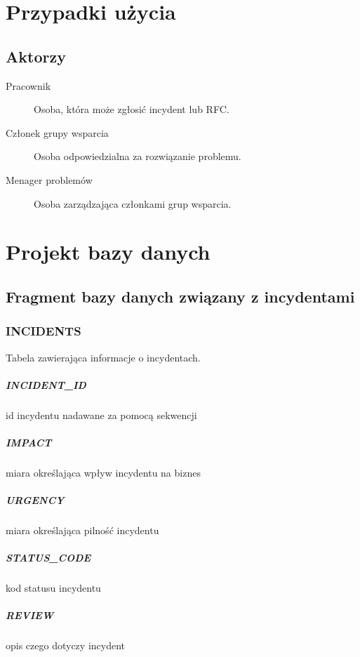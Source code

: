 \documentclass[a4paper, oneside, 11pt]{report}
\begin{document}
\chapter{Przypadki użycia}
\section{Aktorzy}

\begin{description}
 \item[Pracownik] Osoba, która może zgłosić incydent lub RFC.
 \item[Członek grupy wsparcia] Osoba odpowiedzialna za rozwiązanie problemu.
 \item[Menager problemów] Osoba zarządzająca członkami grup wsparcia.
\end{description}

\chapter{Projekt bazy danych}

\section{Fragment bazy danych związany z incydentami}

\subsection{INCIDENTS}

Tabela zawierająca informacje o incydentach.

\paragraph{INCIDENT\_ID} id incydentu nadawane za pomocą sekwencji
\paragraph{IMPACT} miara określająca wpływ incydentu na biznes
\paragraph{URGENCY} miara określająca pilność incydentu
\paragraph{STATUS\_CODE} kod statusu incydentu
\paragraph{REVIEW} opis czego dotyczy incydent
\end{document}
